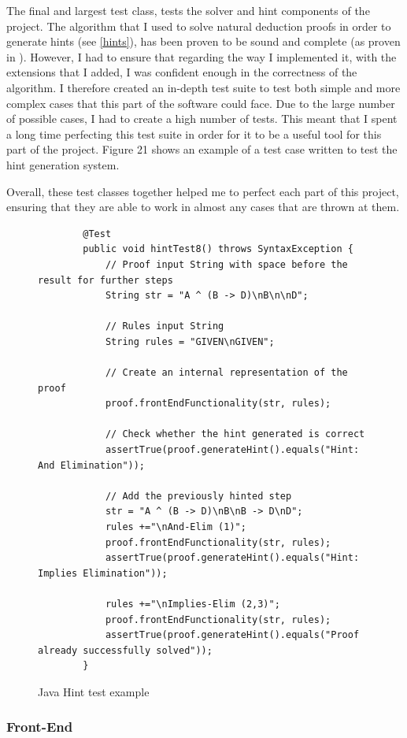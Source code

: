 The final and largest test class, tests the solver and hint components of the project. The algorithm that I used to solve natural deduction proofs in order to generate hints (see \ref{hints}), has been proven to be sound and complete (as proven in \cite{ndAlgo}). However, I had to ensure that regarding the way I implemented it, with the extensions that I added, I was confident enough in the correctness of the algorithm. I therefore created an in-depth test suite to test both simple and more complex cases that this part of the software could face. Due to the large number of possible cases, I had to create a high number of tests. This meant that I spent a long time perfecting this test suite in order for it to be a useful tool for this part of the project. Figure 21 shows an example of a test case written to test the hint generation system. 

Overall, these test classes together helped me to perfect each part of this project, ensuring that they are able to work in almost any cases that are thrown at them.
\pagebreak

\begin{figure}[!ht]
	\begin{lstlisting}
		@Test
		public void hintTest8() throws SyntaxException {
			// Proof input String with space before the result for further steps
			String str = "A ^ (B -> D)\nB\n\nD";
			
			// Rules input String
			String rules = "GIVEN\nGIVEN";

			// Create an internal representation of the proof
			proof.frontEndFunctionality(str, rules);

			// Check whether the hint generated is correct
			assertTrue(proof.generateHint().equals("Hint: And Elimination"));

			// Add the previously hinted step
			str = "A ^ (B -> D)\nB\nB -> D\nD";
			rules +="\nAnd-Elim (1)";
			proof.frontEndFunctionality(str, rules);
			assertTrue(proof.generateHint().equals("Hint: Implies Elimination"));
		
			rules +="\nImplies-Elim (2,3)";
			proof.frontEndFunctionality(str, rules);
			assertTrue(proof.generateHint().equals("Proof already successfully solved"));
		}
\end{lstlisting}
\caption{Java Hint test example}
\end{figure}


\subsubsection{Front-End}


